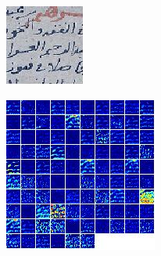 \documentclass[conference,a4paper,twocolumn]{IEEEtran}
\begin{document}
\begin{figure}
\centering
\begin{minipage}{.45\linewidth}
  \includegraphics[width=\linewidth]{figures/input.png}
  \label{img1}
\end{minipage}
\hspace{.05\linewidth}
\begin{minipage}{.45\linewidth}
  \includegraphics[width=\linewidth]{figures/norm1.png}
  \label{img2}
\end{minipage}
\end{figure}
\end{document}
